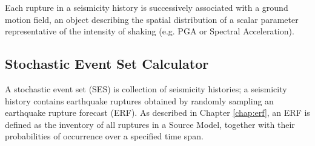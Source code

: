 Each rupture in a seismicity history is successively associated with a ground
motion field, an object describing the spatial distribution of a scalar 
parameter representative of the intensity of shaking (e.g. PGA or Spectral 
Acceleration). 
%
\subsection{Stochastic Event Set Calculator}
A stochastic event set (SES) is collection of seismicity histories; a 
seismicity history contains earthquake ruptures obtained by randomly sampling 
an earthquake rupture forecast (ERF). 
%
As described in Chapter \ref{chap:erf}, an ERF is defined as the inventory of 
all ruptures in a Source Model, together with their probabilities of occurrence 
over a specified time span.


